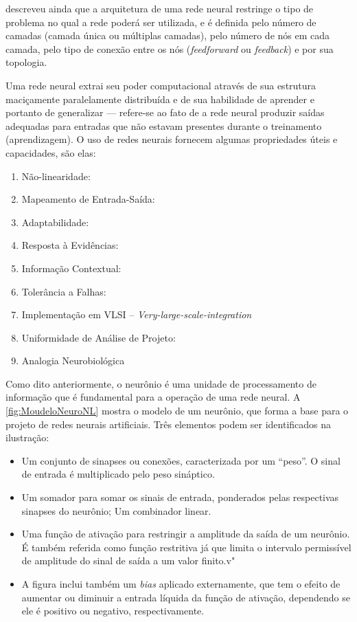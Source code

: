  descreveu ainda que a arquitetura de uma rede neural restringe o tipo de problema no qual a rede poderá ser utilizada, e é definida pelo número de camadas (camada única ou múltiplas camadas), pelo número de nós em cada camada, pelo tipo de conexão entre os nós (\textit{feedforward} ou \textit{feedback}) e por sua topologia.

Uma rede neural extrai seu poder computacional através de sua estrutura maciçamente paralelamente distribuída e de sua habilidade de aprender e portanto de generalizar --- refere-se ao fato de a rede neural produzir saídas adequadas para entradas que não estavam presentes durante o treinamento (aprendizagem). O uso de redes neurais fornecem algumas propriedades úteis e capacidades, são elas:

    \begin{enumerate}
        \item Não-linearidade:
        \item Mapeamento de Entrada-Saída:
        \item Adaptabilidade:
        \item Resposta à Evidências:
        \item Informação Contextual:
        \item Tolerância a Falhas:
        \item Implementação em VLSI -- \textit{Very-large-scale-integration}
        \item Uniformidade de Análise de Projeto:
        \item Analogia Neurobiológica
    \end{enumerate}
    
    Como dito anteriormente, o neurônio é uma unidade de processamento de informação que é fundamental para a operação de uma rede neural. A \autoref{fig:MoudeloNeuroNL} mostra o modelo de um neurônio, que forma a base para o projeto de redes neurais artificiais. Três elementos podem ser identificados na ilustração:
    \begin{itemize}
        \item Um conjunto de sinapses ou conexões, caracterizada por um ``peso''. O sinal de entrada é multiplicado pelo peso sináptico.
        \item Um somador para somar os sinais de entrada, ponderados pelas respectivas sinapses do neurônio; Um combinador linear.
        \item Uma função de ativação para restringir a amplitude da saída de um neurônio. É também referida como função restritiva já que limita o intervalo permissível de amplitude do sinal de saída a um valor finito.v"
        \item A figura inclui também um \textit{bias} aplicado externamente, que tem o efeito de aumentar ou diminuir a entrada líquida da função de ativação, dependendo se ele é positivo ou negativo, respectivamente. 
    \end{itemize}
    
